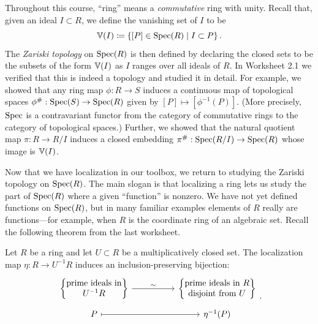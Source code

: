 \documentclass[Notebook.tex]{subfiles}
\begin{document}
\ifSubfilesClassLoaded{}{}


Throughout this course, ``ring'' means a \textit{commutative} ring with unity. Recall that, given an ideal $I \subset R$, we define the vanishing set of $I$ to be
\[
\mathbb V(I) \coloneqq \left\{[P] \in \operatorname{Spec}(R) \;\middle|\; I \subset P\right\}.
\]
The \emph{Zariski topology} on $\operatorname{Spec}(R)$ is then defined by declaring the closed sets to be the subsets of the form $\mathbb V(I)$ as $I$ ranges over all ideals of $R$. In Worksheet 2.1 we verified that this is indeed a topology and studied it in detail. For example, we showed that any ring map $\phi:R \to S$ induces a continuous map of topological spaces $\phi^{\#}: \operatorname{Spec}(S) \to \operatorname{Spec}(R)$ given by $[P] \mapsto [\phi^{-1}(P)]$. (More precisely, $\operatorname{Spec}$ is a contravariant functor from the category of commutative rings to the category of topological spaces.) Further, we showed that the natural quotient map $\pi:R \to R/I$ induces a closed embedding $\pi^{\#}:\operatorname{Spec}(R/I) \to \operatorname{Spec}(R)$ whose image is $\mathbb V(I)$.

Now that we have localization in our toolbox, we return to studying the Zariski topology on $\operatorname{Spec}(R)$. The main slogan is that localizing a ring lets us study the part of $\operatorname{Spec}(R)$ where a given ``function'' is nonzero. We have not yet defined functions on $\operatorname{Spec}(R)$, but in many familiar examples elements of $R$ really are functions—for example, when $R$ is the coordinate ring of an algebraic set. Recall the following theorem from the last worksheet.

\begin{theorem}\label{thm:localization-corr}
    Let $R$ be a ring and let $U \subset R$ be a multiplicatively closed set. The localization map $\eta:R \to U^{-1}R$ induces an inclusion-preserving bijection:
    \[
    \begin{tikzcd}[row sep = .5em, column sep = 5em]
    \left\{ 
    \begin{matrix}
    \text{prime ideals in} \\
    U^{-1}R
    \end{matrix}
    \right\} \arrow[r,"\sim"] & 
    \left\{
    \begin{matrix}
    \text{prime ideals in $R$} \\
    \text{disjoint from $U$} 
    \end{matrix}
    \right\} \\
    P \arrow[r, mapsto] & \eta^{-1}(P)
    \end{tikzcd}.
    \]
\end{theorem}
\end{document}

